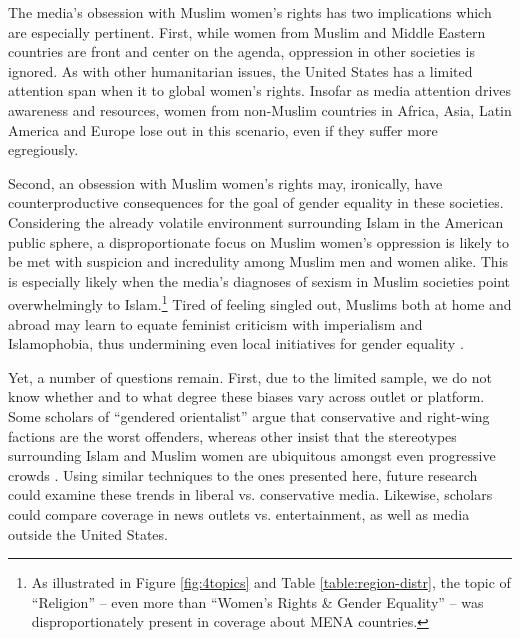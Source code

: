 \documentclass[11pt, oneside]{article}
\begin{document}
The media's obsession with Muslim women's rights has two implications which are especially pertinent. First, while women from Muslim and Middle Eastern countries are front and center on the agenda, oppression in other societies is ignored. As with other humanitarian issues, the United States has a limited attention span when it to global women's rights. Insofar as media attention drives awareness and resources, women from non-Muslim countries in Africa, Asia, Latin America and Europe lose out in this scenario, even if they suffer more egregiously.

Second, an obsession with Muslim women's rights may, ironically, have counterproductive consequences for the goal of gender equality in these societies. Considering the already volatile environment surrounding Islam in the American public sphere, a disproportionate focus on Muslim women's oppression is likely to be met with suspicion and incredulity among Muslim men and women alike. This is especially likely when the media's diagnoses of sexism in Muslim societies point overwhelmingly to Islam.\footnote{\hspace{5}As illustrated in Figure \ref{fig:4topics} and Table \ref{table:region-distr}, the topic of ``Religion'' -- even more than ``Women's Rights \& Gender Equality'' -- was disproportionately present in coverage about MENA countries.} Tired of feeling singled out, Muslims both at home and abroad may learn to equate feminist criticism with imperialism and Islamophobia, thus undermining even local initiatives for gender equality \cite{terman2015islamophobia}.

Yet, a number of questions remain. First, due to the limited sample, we do not know whether and to what degree these biases vary across outlet or platform. Some scholars of ``gendered orientalist'' argue that conservative and right-wing factions are the worst offenders, whereas other insist that the stereotypes surrounding Islam and Muslim women are ubiquitous amongst even progressive crowds \cite{kumar2012islamophobia}. Using similar techniques to the ones presented here, future research could examine these trends in liberal vs. conservative media. Likewise, scholars could compare coverage in news outlets vs. entertainment, as well as media outside the United States.
\end{document}
